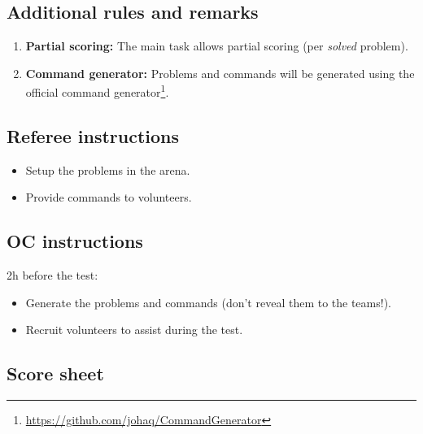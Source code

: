 \subsection*{Additional rules and remarks}
\begin{enumerate}[nosep]
	\item \textbf{Partial scoring:} The main task allows partial scoring (per \emph{solved} problem).

	\item \textbf{Command generator:} Problems and commands will be generated using the official command generator\footnote{\url{https://github.com/johaq/CommandGenerator}}.
\end{enumerate}

\subsection*{Referee instructions}
\begin{itemize}
	\item Setup the problems in the arena.
	\item Provide commands to volunteers.
\end{itemize}

\subsection*{OC instructions}

2h before the test:
\begin{itemize}
	\item Generate the problems and commands (don't reveal them to the teams!).
	\item Recruit volunteers to assist during the test.
\end{itemize}


\subsection*{Score sheet}


